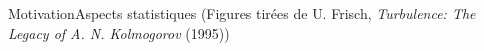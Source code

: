 \documentclass[aspectratio=169,usenames,dvipsnames]{beamer}
\begin{document}
\begin{frame}{Motivation}{Aspects statistiques (Figures tirées de {\color{blue}U. Frisch, \emph{Turbulence: The Legacy of A. N. Kolmogorov} (1995)})}
\begin{figure}
{\begin{subfigure}[b]{0.42\textwidth}
        \end{subfigure}}
    \end{figure}
\end{frame} %
\end{document}
